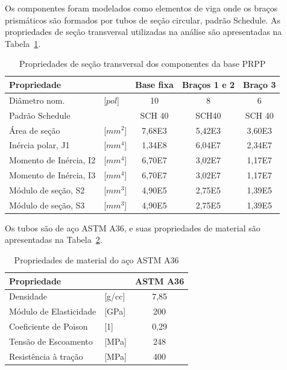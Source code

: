 Os componentes foram modelados como elementos de viga onde os braços prismáticos
são formados por tubos de seção circular, padrão Schedule.
As propriedades de seção transversal utilizadas na análise são apresentadas na
Tabela~\ref{tab::sectrans_schedules}. 
%
\begin{table}[h!]
\centering
\caption{Propriedades de seção transversal dos componentes da base PRPP}
\label{tab::sectrans_schedules}
\begin{tabular}{@{}llccc@{}}
\toprule
\textbf{Propriedade}   &           & \textbf{Base fixa} & \textbf{Braços 1 e 2} & \textbf{Braço 3} \\ \midrule
Diâmetro nom.          & [$pol$] & 10                 & 8                     & 6                \\
Padrão Schedule        &           & SCH 40             & SCH40                 & SCH 40           \\
Área de seção          & [$mm^2$]  & 7,68E3             & 5,42E3                & 3,60E3           \\
Inércia polar, J1      & [$mm^4$]  & 1,34E8             & 6,04E7               
& 2,34E7           \\
Momento de Inércia, I2 & [$mm^4$]  & 6,70E7             & 3,02E7                & 1,17E7           \\
Momento de Inércia, I3 & [$mm^4$]  & 6,70E7             & 3,02E7                & 1,17E7           \\
Módulo de seção, S2    & [$mm^3$]  & 4,90E5             & 2,75E5                & 1,39E5           \\
Módulo de seção, S3    & [$mm^3$]  & 4,90E5             & 2,75E5                & 1,39E5           \\ \bottomrule
\end{tabular}
\end{table}
%

Os tubos são de aço ASTM A36, e suas propriedades de material são apresentadas
na Tabela~\ref{tab::astma36}.
%
\begin{table}[h!]
\centering
\caption{Propriedades de material do aço ASTM A36}
\label{tab::astma36}
\begin{tabular}{@{}llc@{}}
\toprule
\textbf{Propriedade}   & \textbf{}  & \textbf{ASTM A36} \\ \midrule
Densidade              & {[}g/cc{]} & 7,85              \\
Módulo de Elasticidade & {[}GPa{]}  & 200               \\
Coeficiente de Poison  & {[}1{]}    & 0,29              \\
Tensão de Escoamento   & {[}MPa{]}  & 248               \\
Resistência à tração   & {[}MPa{]}  & 400               \\ \bottomrule
\end{tabular}
\end{table}
%

